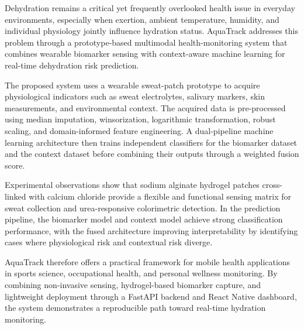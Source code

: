 \vspace{-1cm}


Dehydration remains a critical yet frequently overlooked health issue in everyday environments, especially when exertion, ambient temperature, humidity, and individual physiology jointly influence hydration status. AquaTrack addresses this problem through a prototype-based multimodal health-monitoring system that combines wearable biomarker sensing with context-aware machine learning for real-time dehydration risk prediction.

The proposed system uses a wearable sweat-patch prototype to acquire physiological indicators such as sweat electrolytes, salivary markers, skin measurements, and environmental context. The acquired data is pre-processed using median imputation, winsorization, logarithmic transformation, robust scaling, and domain-informed feature engineering. A dual-pipeline machine learning architecture then trains independent classifiers for the biomarker dataset and the context dataset before combining their outputs through a weighted fusion score.

Experimental observations show that sodium alginate hydrogel patches cross-linked with calcium chloride provide a flexible and functional sensing matrix for sweat collection and urea-responsive colorimetric detection. In the prediction pipeline, the biomarker model and context model achieve strong classification performance, with the fused architecture improving interpretability by identifying cases where physiological risk and contextual risk diverge.

AquaTrack therefore offers a practical framework for mobile health applications in sports science, occupational health, and personal wellness monitoring. By combining non-invasive sensing, hydrogel-based biomarker capture, and lightweight deployment through a FastAPI backend and React Native dashboard, the system demonstrates a reproducible path toward real-time hydration monitoring.

\pagebreak
